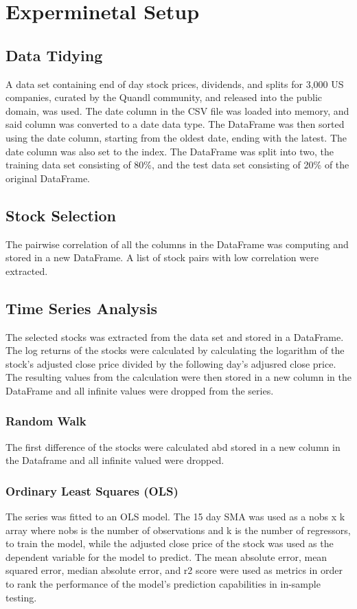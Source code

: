 \chapter{Experminetal Setup}

\section{Data Tidying}
A data set containing end of day stock prices, dividends, and splits for 3,000 US companies, curated by the Quandl community, and released into the public domain, was used. The date column in the CSV file was loaded into memory, and said column was converted to a date data type. The DataFrame was then sorted using the date column, starting from the oldest date, ending with the latest. The date column was also set to the index. The DataFrame was split into two, the training data set consisting of 80\%, and the test data set consisting of 20\% of the original DataFrame.

\section{Stock Selection}
The pairwise correlation of all the columns in the DataFrame was computing and stored in a new DataFrame. A list of stock pairs with low correlation were extracted.

\section{Time Series Analysis}
The selected stocks was extracted from the data set and stored in a DataFrame. The log returns of the stocks were calculated by calculating the logarithm of the stock's adjusted close price divided by the following day's adjusred close price. The resulting values from the calculation were then stored in a new column in the DataFrame and all infinite values were dropped from the series.

\subsection{Random Walk}
The first difference of the stocks were calculated abd stored in a new column in the Dataframe and all infinite valued were dropped.

\subsection{Ordinary Least Squares (OLS)}
The series was fitted to an OLS model. The 15 day SMA was used as a nobs x k array where nobs is the number of observations and k is the number of regressors, to train the model, while the adjusted close price of the stock was used as the dependent variable for the model to predict. The mean absolute error, mean squared error, median absolute error, and r2 score were used as metrics in order to rank the performance of the model's prediction capabilities in in-sample testing.

